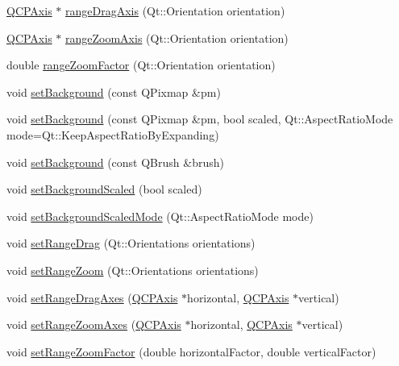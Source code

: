\begin{DoxyCompactItemize}
\item 
\hyperlink{class_q_c_p_axis}{Q\+C\+P\+Axis} $\ast$ \hyperlink{class_q_c_p_axis_rect_a6d7c22cfc54fac7a3d6ef80b133a8574}{range\+Drag\+Axis} (Qt\+::\+Orientation orientation)
\item 
\hyperlink{class_q_c_p_axis}{Q\+C\+P\+Axis} $\ast$ \hyperlink{class_q_c_p_axis_rect_a679c63f2b8daccfe6ec5110dce3dd3b6}{range\+Zoom\+Axis} (Qt\+::\+Orientation orientation)
\item 
double \hyperlink{class_q_c_p_axis_rect_ae4e6c4d143aacc88d2d3c56f117c2fe1}{range\+Zoom\+Factor} (Qt\+::\+Orientation orientation)
\item 
void \hyperlink{class_q_c_p_axis_rect_af615ab5e52b8e0a9a0eff415b6559db5}{set\+Background} (const Q\+Pixmap \&pm)
\item 
void \hyperlink{class_q_c_p_axis_rect_ac48a2d5d9b7732e73b86605c69c5e4c1}{set\+Background} (const Q\+Pixmap \&pm, bool scaled, Qt\+::\+Aspect\+Ratio\+Mode mode=Qt\+::\+Keep\+Aspect\+Ratio\+By\+Expanding)
\item 
void \hyperlink{class_q_c_p_axis_rect_a22a22b8668735438dc06f9a55fe46b33}{set\+Background} (const Q\+Brush \&brush)
\item 
void \hyperlink{class_q_c_p_axis_rect_ae6d36c3e0e968ffb991170a018e7b503}{set\+Background\+Scaled} (bool scaled)
\item 
void \hyperlink{class_q_c_p_axis_rect_a5ef77ea829c9de7ba248e473f48f7305}{set\+Background\+Scaled\+Mode} (Qt\+::\+Aspect\+Ratio\+Mode mode)
\item 
void \hyperlink{class_q_c_p_axis_rect_ae6aef2f7211ba6097c925dcd26008418}{set\+Range\+Drag} (Qt\+::\+Orientations orientations)
\item 
void \hyperlink{class_q_c_p_axis_rect_a7960a9d222f1c31d558b064b60f86a31}{set\+Range\+Zoom} (Qt\+::\+Orientations orientations)
\item 
void \hyperlink{class_q_c_p_axis_rect_a648cce336bd99daac4a5ca3e5743775d}{set\+Range\+Drag\+Axes} (\hyperlink{class_q_c_p_axis}{Q\+C\+P\+Axis} $\ast$horizontal, \hyperlink{class_q_c_p_axis}{Q\+C\+P\+Axis} $\ast$vertical)
\item 
void \hyperlink{class_q_c_p_axis_rect_a9442cca2aa358405f39a64d51eca13d2}{set\+Range\+Zoom\+Axes} (\hyperlink{class_q_c_p_axis}{Q\+C\+P\+Axis} $\ast$horizontal, \hyperlink{class_q_c_p_axis}{Q\+C\+P\+Axis} $\ast$vertical)
\item 
void \hyperlink{class_q_c_p_axis_rect_a895d7ac745ea614e04056244b3c138ac}{set\+Range\+Zoom\+Factor} (double horizontal\+Factor, double vertical\+Factor)

\end{DoxyCompactItemize}
